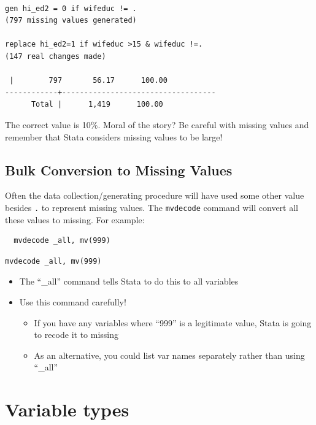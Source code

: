 \documentclass[]{book}
\providecommand{\tightlist}{%
  \setlength{\itemsep}{0pt}\setlength{\parskip}{0pt}}
\begin{document}
\begin{verbatim}

gen hi_ed2 = 0 if wifeduc != . 
(797 missing values generated)

replace hi_ed2=1 if wifeduc >15 & wifeduc !=. 
(147 real changes made)

 |        797       56.17      100.00
------------+-----------------------------------
      Total |      1,419      100.00
\end{verbatim}

The correct value is 10\%. Moral of the story? Be careful with missing
values and remember that Stata considers missing values to be large!

\subsection{Bulk Conversion to Missing
Values}\label{bulk-conversion-to-missing-values}

Often the data collection/generating procedure will have used some other
value besides \texttt{.} to represent missing values. The
\texttt{mvdecode} command will convert all these values to missing. For
example:

\begin{verbatim}
  mvdecode _all, mv(999)
\end{verbatim}

\begin{verbatim}
mvdecode _all, mv(999)
\end{verbatim}

\begin{itemize}
\tightlist
\item
  The ``\_all'' command tells Stata to do this to all variables
\item
  Use this command carefully!

  \begin{itemize}
  \tightlist
  \item
    If you have any variables where ``999'' is a legitimate value, Stata
    is going to recode it to missing
  \item
    As an alternative, you could list var names separately rather than
    using ``\_all''
  \end{itemize}
\end{itemize}

\section{Variable types}\label{variable-types}
\end{document}
